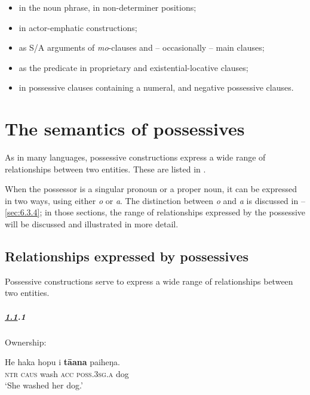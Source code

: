 \begin{itemize}
\item 
in the noun phrase, in non-determiner positions;

\item 
in actor-emphatic constructions;

\item 
as S/A arguments of \textit{mo}{}-clauses and – occasionally – main clauses;

\item 
as the predicate in proprietary and existential-locative clauses;

\item 
in possessive clauses containing a numeral, and negative possessive clauses.

\end{itemize}
\section{The semantics of possessives}\label{sec:6.3}

As in many languages, possessive constructions express a wide range of relationships between two entities. These are listed in .

When the possessor is a singular pronoun or a proper noun, it can be expressed in two ways, using either \textit{o} or \textit{a}. The distinction between \textit{o} and \textit{a} is discussed in –\ref{sec:6.3.4}; in those sections, the range of relationships expressed by the possessive will be discussed and illustrated in more detail. 

\subsection{Relationships expressed by possessives}\label{sec:6.3.1}

Possessive constructions serve to express a wide range of relationships between two entities.

\subparagraph{\ref{sec:6.3.1}.1} Ownership:

\ea\label{ex:6.35}
\gll He haka hopu i \textbf{tā{\ꞌ}ana} paiheŋa.\\
\textsc{ntr} \textsc{caus} wash \textsc{acc} \textsc{poss.3sg.a} dog\\

\glt 
‘She washed her dog.’ \textstyleExampleref{[R168.012]} 
\z

